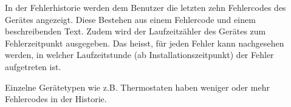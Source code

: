 In der Fehlerhistorie werden dem Benutzer die letzten zehn Fehlercodes des Gerätes angezeigt. Diese Bestehen aus einem Fehlercode und einem beschreibenden Text. Zudem wird der Laufzeitzähler des Gerätes zum Fehlerzeitpunkt ausgegeben. Das heisst, für jeden Fehler kann nachgesehen werden, in welcher Laufzeitstunde (ab Installationszeitpunkt) der Fehler aufgetreten ist.

Einzelne Gerätetypen wie z.B. Thermostaten haben weniger oder mehr Fehlercodes in der Historie.